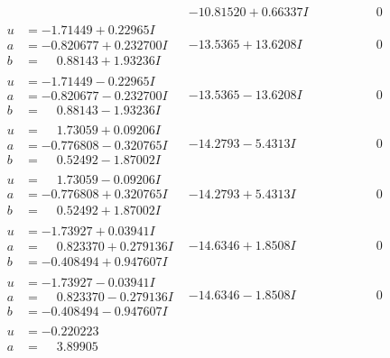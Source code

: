 \documentclass[1p]{elsarticle_modified}
\theoremstyle{definition}
\begin{document}
$$\begin{array}{c|c|c}
 & -10.81520 + 0.66337 I & \phantom{-0.000000 } 0 \\ \hline\begin{aligned}
u &= -1.71449 + 0.22965 I \\
a &= -0.820677 + 0.232700 I \\
b &= \phantom{-}0.88143 + 1.93236 I\end{aligned}
 & -13.5365 + 13.6208 I & \phantom{-0.000000 } 0 \\ \hline\begin{aligned}
u &= -1.71449 - 0.22965 I \\
a &= -0.820677 - 0.232700 I \\
b &= \phantom{-}0.88143 - 1.93236 I\end{aligned}
 & -13.5365 - 13.6208 I & \phantom{-0.000000 } 0 \\ \hline\begin{aligned}
u &= \phantom{-}1.73059 + 0.09206 I \\
a &= -0.776808 - 0.320765 I \\
b &= \phantom{-}0.52492 - 1.87002 I\end{aligned}
 & -14.2793 - 5.4313 I & \phantom{-0.000000 } 0 \\ \hline\begin{aligned}
u &= \phantom{-}1.73059 - 0.09206 I \\
a &= -0.776808 + 0.320765 I \\
b &= \phantom{-}0.52492 + 1.87002 I\end{aligned}
 & -14.2793 + 5.4313 I & \phantom{-0.000000 } 0 \\ \hline\begin{aligned}
u &= -1.73927 + 0.03941 I \\
a &= \phantom{-}0.823370 + 0.279136 I \\
b &= -0.408494 + 0.947607 I\end{aligned}
 & -14.6346 + 1.8508 I & \phantom{-0.000000 } 0 \\ \hline\begin{aligned}
u &= -1.73927 - 0.03941 I \\
a &= \phantom{-}0.823370 - 0.279136 I \\
b &= -0.408494 - 0.947607 I\end{aligned}
 & -14.6346 - 1.8508 I & \phantom{-0.000000 } 0 \\ \hline\begin{aligned}
u &= -0.220223\phantom{ +0.000000I} \\
a &= \phantom{-}3.89905\phantom{ +0.000000I} \\

\end{aligned}
\end{array}$$
\end{document}
